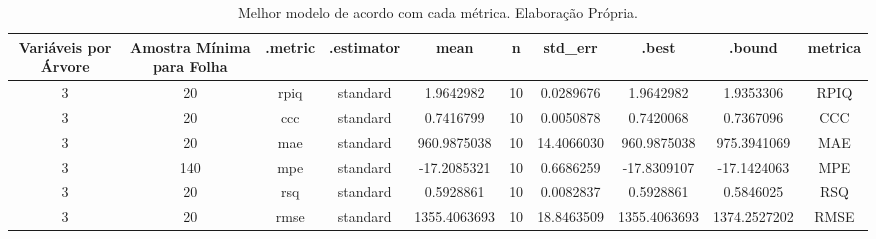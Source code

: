 \begin{table}[H]

\caption{\label{tab:tabela_metricas}Melhor modelo de acordo com cada métrica. Elaboração Própria.}
\centering
\begin{tabular}[t]{c|c|c|c|c|c|c|c|c|c}
\hline
Variáveis por Árvore & Amostra Mínima para Folha & .metric & .estimator & mean & n & std\_err & .best & .bound & metrica\\
\hline
3 & 20 & rpiq & standard & 1.9642982 & 10 & 0.0289676 & 1.9642982 & 1.9353306 & RPIQ\\
\hline
3 & 20 & ccc & standard & 0.7416799 & 10 & 0.0050878 & 0.7420068 & 0.7367096 & CCC\\
\hline
3 & 20 & mae & standard & 960.9875038 & 10 & 14.4066030 & 960.9875038 & 975.3941069 & MAE\\
\hline
3 & 140 & mpe & standard & -17.2085321 & 10 & 0.6686259 & -17.8309107 & -17.1424063 & MPE\\
\hline
3 & 20 & rsq & standard & 0.5928861 & 10 & 0.0082837 & 0.5928861 & 0.5846025 & RSQ\\
\hline
3 & 20 & rmse & standard & 1355.4063693 & 10 & 18.8463509 & 1355.4063693 & 1374.2527202 & RMSE\\
\hline
\end{tabular}
\end{table}
